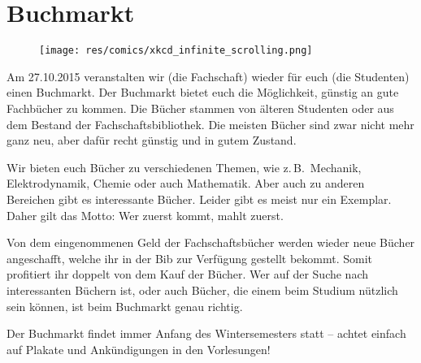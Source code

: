 \vspace{-6ex}
\section{Buchmarkt}
\vspace{-3ex}
\begin{multicols*}{2}
{%

\begin{wrapfigure}[12]{r}{0cm}
	\texttt{[image: res/comics/xkcd\_infinite\_scrolling.png]}
\end{wrapfigure}
Am 27.10.2015 veranstalten wir (die Fachschaft) wieder für euch (die Studenten) einen Buchmarkt. Der Buchmarkt bietet euch die Möglichkeit, günstig an gute Fachbücher zu kommen. Die Bücher stammen von älteren Studenten oder aus dem Bestand der Fachschaftsbibliothek. Die meisten Bücher sind zwar nicht mehr ganz neu, aber dafür recht günstig und in gutem Zustand.

Wir bieten euch Bücher zu verschiedenen Themen, wie z.\,B.\ Mechanik, Elektrodynamik, Chemie oder auch Mathematik. Aber auch zu anderen Bereichen gibt es interessante Bücher. Leider gibt es meist nur ein Exemplar. Daher gilt das Motto: Wer zuerst kommt, mahlt zuerst.}

Von dem eingenommenen Geld der Fachschaftsbücher werden wieder neue Bücher angeschafft, welche ihr in der Bib zur Verfügung gestellt bekommt. Somit profitiert ihr doppelt von dem Kauf der Bücher.
Wer auf der Suche nach interessanten Büchern ist, oder auch Bücher, die einem beim Studium nützlich sein können, ist beim Buchmarkt genau richtig.

Der Buchmarkt findet immer Anfang des Wintersemesters statt -- achtet einfach auf Plakate und Ankündigungen in den Vorlesungen!

\end{multicols*}

